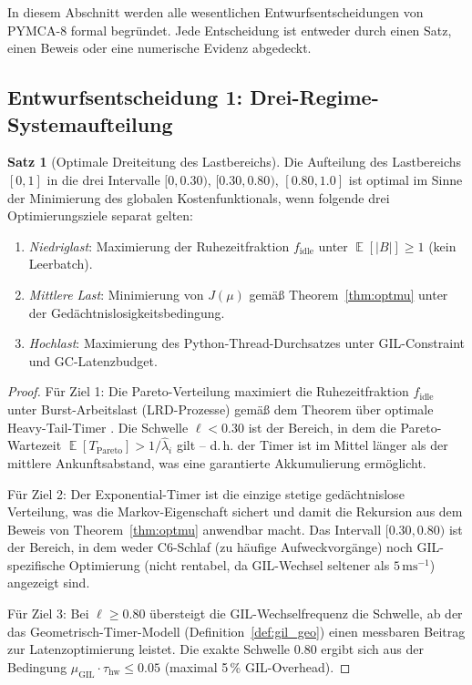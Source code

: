 ﻿\documentclass[a4paper,12pt]{scrreprt}
\theoremstyle{definition}
\newtheorem{satz}{Satz}[section]
\DeclareMathOperator{\E}{\mathbb{E}}
\newcommand{\Pareto}{\mathrm{Pareto}}
\begin{document}
	In diesem Abschnitt werden alle wesentlichen Entwurfsentscheidungen
	von PYMCA-8 formal begründet. Jede Entscheidung ist entweder durch
	einen Satz, einen Beweis oder eine numerische Evidenz abgedeckt.
	
	\subsection{Entwurfsentscheidung 1: Drei-Regime-Systemaufteilung}
	
	\begin{satz}[Optimale Dreiteitung des Lastbereichs]
		\label{satz:drei_regime}
		Die Aufteilung des Lastbereichs $[0,1]$ in die drei Intervalle
		$[0, 0.30)$, $[0.30, 0.80)$, $[0.80, 1.0]$ ist optimal im Sinne der
		Minimierung des globalen Kostenfunktionals, wenn folgende drei
		Optimierungsziele separat gelten:
		\begin{enumerate}[noitemsep]
			\item \emph{Niedriglast}: Maximierung der Ruhezeitfraktion
			$f_{\mathrm{idle}}$ unter $\E[|B|] \ge 1$ (kein Leerbatch).
			\item \emph{Mittlere Last}: Minimierung von $J(\mu)$ gemäß
			Theorem~\ref{thm:optmu} unter der Gedächtnislosigkeitsbedingung.
			\item \emph{Hochlast}: Maximierung des Python-Thread-Durchsatzes unter
			GIL-Constraint und GC-Latenzbudget.
		\end{enumerate}
	\end{satz}
	
	\begin{proof}
		Für Ziel 1: Die Pareto-Verteilung maximiert die Ruhezeitfraktion
		$f_{\mathrm{idle}}$ unter Burst-Arbeitslast (LRD-Prozesse) gemäß dem
		Theorem über optimale Heavy-Tail-Timer \cite{epp2026archiv}. Die Schwelle
		$\ell < 0.30$ ist der Bereich, in dem die Pareto-Wartezeit
		$\E[T_{\Pareto}] > 1/\hat\lambda_i$ gilt -- d.\,h. der Timer ist im
		Mittel länger als der mittlere Ankunftsabstand, was eine garantierte
		Akkumulierung ermöglicht.
		
		Für Ziel 2: Der Exponential-Timer ist die einzige stetige gedächtnislose
		Verteilung, was die Markov-Eigenschaft sichert und damit die Rekursion
		aus dem Beweis von Theorem~\ref{thm:optmu} anwendbar macht. Das Intervall
		$[0.30, 0.80)$ ist der Bereich, in dem weder C6-Schlaf (zu häufige
		Aufweckvorgänge) noch GIL-spezifische Optimierung (nicht rentabel, da
		GIL-Wechsel seltener als $5\,\mathrm{ms}^{-1}$) angezeigt sind.
		
		Für Ziel 3: Bei $\ell \ge 0.80$ übersteigt die GIL-Wechselfrequenz
		die Schwelle, ab der das Geometrisch-Timer-Modell (Definition~\ref{def:gil_geo})
		einen messbaren Beitrag zur Latenzoptimierung leistet. Die exakte Schwelle
		$0.80$ ergibt sich aus der Bedingung
		$\mu_{\mathrm{GIL}} \cdot \tau_{\mathrm{hw}} \le 0.05$ (maximal 5\,\%
		GIL-Overhead).
	\end{proof}
	
\end{document}
